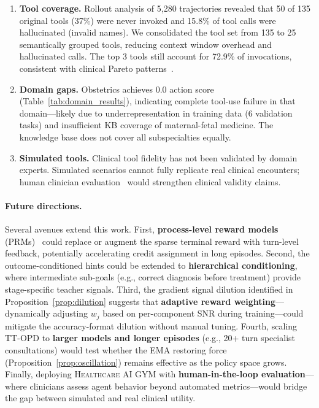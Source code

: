 \documentclass{article}
\newcommand{\gym}{\textsc{Healthcare AI GYM}}
\begin{document}
\begin{enumerate}[leftmargin=*,itemsep=1pt,topsep=2pt]
    \item \textbf{Tool coverage.} Rollout analysis of 5,280 trajectories revealed that 50 of 135 original tools (37\%) were never invoked and 15.8\% of tool calls were hallucinated (invalid names). We consolidated the tool set from 135 to 25 semantically grouped tools, reducing context window overhead and hallucinated calls. The top 3 tools still account for 72.9\% of invocations, consistent with clinical Pareto patterns~\citep{thirunavukarasu2023medicalai}.
    \item \textbf{Domain gaps.} Obstetrics achieves 0.0 action score (Table~\ref{tab:domain_results}), indicating complete tool-use failure in that domain---likely due to underrepresentation in training data (6 validation tasks) and insufficient KB coverage of maternal-fetal medicine. The knowledge base does not cover all subspecialties equally.
    \item \textbf{Simulated tools.} Clinical tool fidelity has not been validated by domain experts. Simulated scenarios cannot fully replicate real clinical encounters; human clinician evaluation~\citep{singhal2023medpalm2} would strengthen clinical validity claims.
\end{enumerate}

\paragraph{Future directions.} Several avenues extend this work. First, \textbf{process-level reward models} (PRMs)~\citep{lightman2024lets, uesato2022solving} could replace or augment the sparse terminal reward with turn-level feedback, potentially accelerating credit assignment in long episodes. Second, the outcome-conditioned hints could be extended to \textbf{hierarchical conditioning}, where intermediate sub-goals (e.g., correct diagnosis before treatment) provide stage-specific teacher signals. Third, the gradient signal dilution identified in Proposition~\ref{prop:dilution} suggests that \textbf{adaptive reward weighting}---dynamically adjusting $w_j$ based on per-component SNR during training---could mitigate the accuracy-format dilution without manual tuning. Fourth, scaling TT-OPD to \textbf{larger models and longer episodes} (e.g., 20+ turn specialist consultations) would test whether the EMA restoring force (Proposition~\ref{prop:oscillation}) remains effective as the policy space grows. Finally, deploying \gym{} with \textbf{human-in-the-loop evaluation}---where clinicians assess agent behavior beyond automated metrics---would bridge the gap between simulated and real clinical utility.
\end{document}
